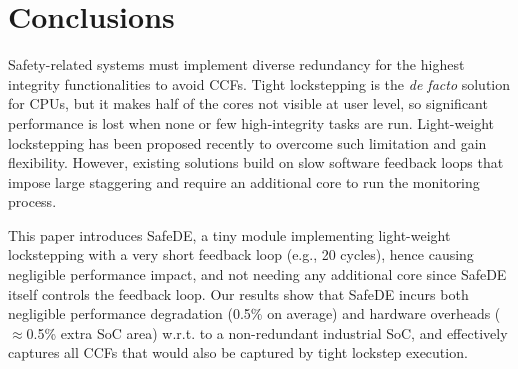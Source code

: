 \section{Conclusions}
\label{sec:concl}


Safety-related systems must implement diverse redundancy for the highest integrity functionalities to avoid CCFs. Tight lockstepping is the \emph{de facto} solution for CPUs, but it makes half of the cores not visible at user level, so significant performance is lost when none or few high-integrity tasks are run. Light-weight lockstepping has been proposed recently to overcome such limitation and gain flexibility. However, existing solutions build on slow software feedback loops that impose large staggering and require an additional core to run the monitoring process.

This paper introduces SafeDE, a tiny module implementing light-weight lockstepping with a very short feedback loop (e.g., 20 cycles), hence causing negligible performance impact, and not needing any additional core since SafeDE itself controls the feedback loop. Our results show that SafeDE incurs both negligible performance degradation (0.5\% on average) and hardware overheads ($\approx$0.5\% extra SoC area) w.r.t. to a non-redundant industrial SoC, and effectively captures all CCFs that would also be captured by tight lockstep execution.
